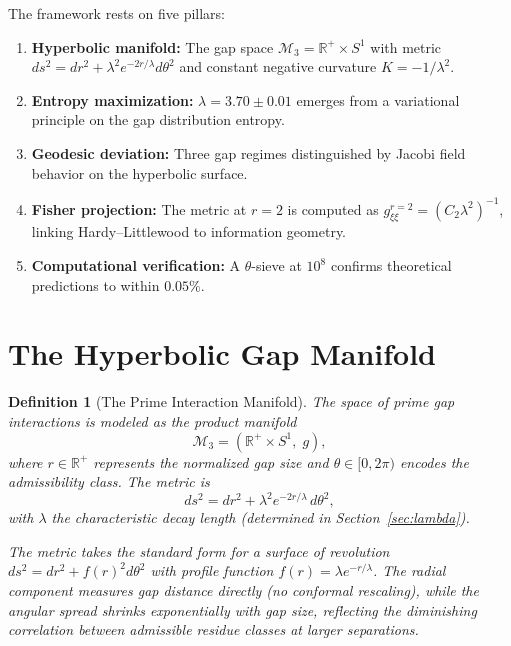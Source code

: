 \documentclass[12pt]{article}
\newtheorem{definition}[theorem]{Definition}
\begin{document}
The framework rests on five pillars:

\begin{enumerate}
  \item \textbf{Hyperbolic manifold:} The gap space $\mathcal{M}_3 = \mathbb{R}^+ \times S^1$
    with metric $ds^2 = dr^2 + \lambda^2 e^{-2r/\lambda} d\theta^2$ and constant
    negative curvature $K = -1/\lambda^2$.
  \item \textbf{Entropy maximization:} $\lambda = 3.70 \pm 0.01$ emerges from a
    variational principle on the gap distribution entropy.
  \item \textbf{Geodesic deviation:} Three gap regimes distinguished by Jacobi
    field behavior on the hyperbolic surface.
  \item \textbf{Fisher projection:} The metric at $r=2$ is computed as
    $g_{\xi\xi}^{r=2} = (C_2 \lambda^2)^{-1}$, linking Hardy--Littlewood to
    information geometry.
  \item \textbf{Computational verification:} A $\theta$-sieve at $10^8$ confirms
    theoretical predictions to within $0.05\%$.
\end{enumerate}

\section{The Hyperbolic Gap Manifold}

\begin{definition}[The Prime Interaction Manifold]
The space of prime gap interactions is modeled as the product manifold
\[
  \mathcal{M}_3 = \left(\mathbb{R}^+ \times S^1,\; g\right),
\]
where $r \in \mathbb{R}^+$ represents the normalized gap size and
$\theta \in [0, 2\pi)$ encodes the admissibility class. The metric is
\begin{equation}
  ds^2 = dr^2 + \lambda^2 e^{-2r/\lambda}\, d\theta^2,
  \label{eq:metric}
\end{equation}
with $\lambda$ the characteristic decay length (determined in
Section~\ref{sec:lambda}).

The metric takes the standard form for a surface of revolution $ds^2 = dr^2 + f(r)^2 d\theta^2$
with profile function $f(r) = \lambda e^{-r/\lambda}$. The radial component measures
gap distance directly (no conformal rescaling), while the angular spread shrinks
exponentially with gap size, reflecting the diminishing correlation between
admissible residue classes at larger separations.
\end{definition}
\end{document}
